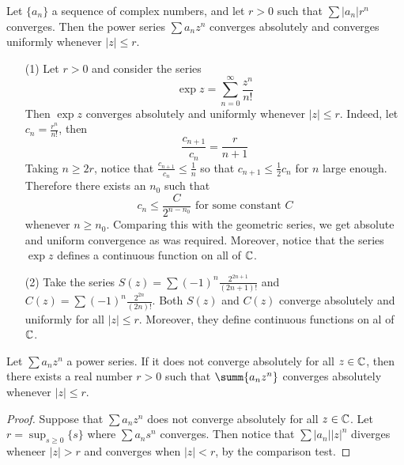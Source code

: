 \begin{theorem}\label{2.2.9}
    Let $\{a_n\}$ a sequence of complex numbers, and let $r>0$ such that
    $\sum{|a_n|r^n}$ converges. Then the power series $\sum{a_nz^n}$ converges
    absolutely and converges uniformly whenever $|z| \leq r$.
\end{theorem}

\begin{example}\label{example_2.3}
    \begin{enumerate}
        \item[(1)] Let $r>0$ and consider the series
            \begin{equation*}
                \exp{z}=\sum_{n=0}^\infty{\frac{z^n}{n!}}
            \end{equation*}
        Then $\exp{z}$ converges absolutely and uniformly whenever $|z| \leq
        r$. Indeed, let $c_n=\frac{r^n}{n!}$, then
        \begin{equation*}
            \frac{c_{n+1}}{c_n}=\frac{r}{n+1}
        \end{equation*}
        Taking $n \geq 2r$, notice that  $\frac{c_{n+1}}{c_n} \leq \frac{1}{n}$
        so that $c_{n+1} \leq \frac{1}{2}c_n$ for $n$ large enough. Therefore
        there exists  an $n_0$ such that
        \begin{equation*}
            c_n \leq \frac{C}{2^{n-n_0}} \text{ for some constant } C
        \end{equation*}
        whenever $n \geq n_0$. Comparing this with the geometric series, we get
        absolute and uniform convergence as was required. Moreover, notice that
        the series $\exp{z}$ defines a continuous function on all of $\mathbb{C}$.

    \item[(2)] Take the series $S(z)=\sum{(-1)^n\frac{2^{2n+1}}{(2n+1)!}}$ and
        $C(z)=\sum{(-1)^n\frac{2^{2n}}{(2n)!}}$. Both $S(z)$ and $C(z)$ converge
        absolutely and uniformly for all $|z| \leq r$. Moreover, they define
        continuous functions on al of  $\mathbb{C}$.
    \end{enumerate}
\end{example}

\begin{theorem}\label{2.2.10}
    Let $\sum{a_nz^n}$ a power series. If it does not converge absolutely for
    all $z \in \mathbb{C}$, then there exists a real number $r>0$ such that
    $\summ{a_nz^n}$ converges absolutely whenever $|z| \leq r$.
\end{theorem}
\begin{proof}
    Suppose that $\sum{a_nz^n}$ does not converge absolutely for all $z \in \mathbb{C}$.
    Let  $r=\sup_{s \geq 0}{\{s\}}$ where $\sum{a_ns^n}$ converges. Then notice
    that $\sum{|a_n||z|^n}$ diverges wheneer $|z|>r$ and converges when  $|z|<r$,
    by the comparison test.
\end{proof}

